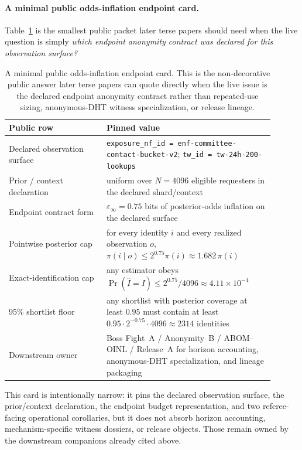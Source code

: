 \documentclass[11pt]{article}
\theoremstyle{definition}
\theoremstyle{remark}
\begin{document}
\paragraph{A minimal public odds-inflation endpoint card.}
Table~\ref{tab:minimal-odds-inflation-card} is the smallest public packet later terse papers should need when the live question is simply \emph{which endpoint anonymity contract was declared for this observation surface?}

\begin{table}[t]
\centering
\small
\begin{tabular}{@{}p{0.33\linewidth}p{0.57\linewidth}@{}}
\toprule
\textbf{Public row} & \textbf{Pinned value}\\
\midrule
Declared observation surface & \texttt{exposure\_nf\_id = enf-committee-contact-bucket-v2}; \texttt{tw\_id = tw-24h-200-lookups} \\
Prior / context declaration & uniform over $N=4096$ eligible requesters in the declared shard/context \\
Endpoint contract form & $\varepsilon_\infty = 0.75$ bits of posterior-odds inflation on the declared surface \\
Pointwise posterior cap & for every identity $i$ and every realized observation $o$, $\pi(i\mid o) \le 2^{0.75}\pi(i) \approx 1.682\,\pi(i)$ \\
Exact-identification cap & any estimator obeys $\Pr(\widehat I = I) \le 2^{0.75}/4096 \approx 4.11\times 10^{-4}$ \\
95\% shortlist floor & any shortlist with posterior coverage at least $0.95$ must contain at least $0.95\cdot 2^{-0.75}\cdot 4096 \approx 2314$ identities \\
Downstream owner & Boss Fight~A / Anonymity~B / ABOM--OINL / Release~A for horizon accounting, anonymous-DHT specialization, and lineage packaging \\
\bottomrule
\end{tabular}
\caption{A minimal public odds-inflation endpoint card. This is the non-decorative public answer later terse papers can quote directly when the live issue is the declared endpoint anonymity contract rather than repeated-use sizing, anonymous-DHT witness specialization, or release lineage.}
\label{tab:minimal-odds-inflation-card}
\end{table}

This card is intentionally narrow: it pins the declared observation surface, the prior/context declaration, the endpoint budget representation, and two referee-facing operational corollaries, but it does not absorb horizon accounting, mechanism-specific witness dossiers, or release objects. Those remain owned by the downstream companions already cited above.\cite{series:bossfightA,series:profiling,series:abomoinl,series:releaseA}
\end{document}
